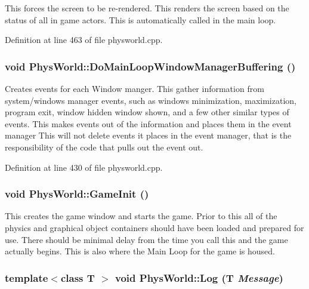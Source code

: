 This forces the screen to be re-\/rendered. This renders the screen based on the status of all in game actors. This is automatically called in the main loop. 

Definition at line 463 of file physworld.cpp.\hypertarget{classPhysWorld_ae81bab7f314d98f7b787c508e60c9c9a}{
\subsubsection[{DoMainLoopWindowManagerBuffering}]{\setlength{\rightskip}{0pt plus 5cm}void PhysWorld::DoMainLoopWindowManagerBuffering ()}}
\label{db/df5/classPhysWorld_ae81bab7f314d98f7b787c508e60c9c9a}


Creates events for each Window manger. This gather information from system/windows manager events, such as windows minimization, maximization, program exit, window hidden window shown, and a few other similar types of events. This makes events out of the information and places them in the event manager This will not delete events it places in the event manager, that is the responsibility of the code that pulls out the event out. 

Definition at line 430 of file physworld.cpp.\hypertarget{classPhysWorld_a6d65a7412c1711497fbd1173f879243a}{
\subsubsection[{GameInit}]{\setlength{\rightskip}{0pt plus 5cm}void PhysWorld::GameInit ()}}
\label{db/df5/classPhysWorld_a6d65a7412c1711497fbd1173f879243a}


This creates the game window and starts the game. Prior to this all of the physics and graphical object containers should have been loaded and prepared for use. There should be minimal delay from the time you call this and the game actually begins. This is also where the Main Loop for the game is housed. \hypertarget{classPhysWorld_a5e9fead1c3100f5dbd5ca985b82b85ea}{
\subsubsection[{Log}]{\setlength{\rightskip}{0pt plus 5cm}template$<$class T $>$ void PhysWorld::Log (T {\em Message})}}
\label{db/df5/classPhysWorld_a5e9fead1c3100f5dbd5ca985b82b85ea}


